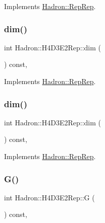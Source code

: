Implements \mbox{\hyperlink{structHadron_1_1RepRep_a92c8802e5ed7afd7da43ccfd5b7cd92b}{Hadron\+::\+Rep\+Rep}}.

\mbox{\label{structHadron_1_1H4D3E2Rep_a893b03ad67a5405ffd75b792cc5fe6f1}} 
\subsubsection{\texorpdfstring{dim()}{dim()}\hspace{0.1cm}{\footnotesize\ttfamily [2/3]}}
{\footnotesize\ttfamily int Hadron\+::\+H4\+D3\+E2\+Rep\+::dim (\begin{DoxyParamCaption}{ }\end{DoxyParamCaption}) const\hspace{0.3cm}{\ttfamily [inline]}, {\ttfamily [virtual]}}



Implements \mbox{\hyperlink{structHadron_1_1RepRep_a92c8802e5ed7afd7da43ccfd5b7cd92b}{Hadron\+::\+Rep\+Rep}}.

\mbox{\label{structHadron_1_1H4D3E2Rep_a893b03ad67a5405ffd75b792cc5fe6f1}} 
\subsubsection{\texorpdfstring{dim()}{dim()}\hspace{0.1cm}{\footnotesize\ttfamily [3/3]}}
{\footnotesize\ttfamily int Hadron\+::\+H4\+D3\+E2\+Rep\+::dim (\begin{DoxyParamCaption}{ }\end{DoxyParamCaption}) const\hspace{0.3cm}{\ttfamily [inline]}, {\ttfamily [virtual]}}



Implements \mbox{\hyperlink{structHadron_1_1RepRep_a92c8802e5ed7afd7da43ccfd5b7cd92b}{Hadron\+::\+Rep\+Rep}}.

\mbox{\label{structHadron_1_1H4D3E2Rep_a2fb62d571edaca91fd4f1f7f6ada2fbd}} 
\subsubsection{\texorpdfstring{G()}{G()}\hspace{0.1cm}{\footnotesize\ttfamily [1/2]}}
{\footnotesize\ttfamily int Hadron\+::\+H4\+D3\+E2\+Rep\+::G (\begin{DoxyParamCaption}{ }\end{DoxyParamCaption}) const\hspace{0.3cm}{\ttfamily [inline]}, {\ttfamily [virtual]}}

